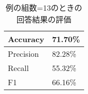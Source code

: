 \begin{table}[H]
\centering
\caption{例の組数=13のときの回答結果の評価}
\begin{tabular}{|l|l|}
\hline
Accuracy    & 71.70\% \\ \hline
Precision   & 82.28\% \\ \hline
Recall      & 55.32\% \\ \hline
F1          & 66.16\% \\ \hline
\end{tabular}
\label{cf-sw40-ex13-m}
\end{table}